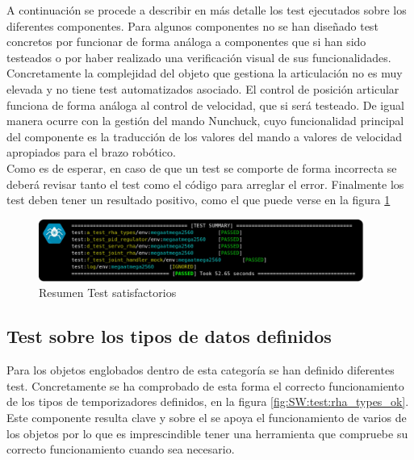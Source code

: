     A continuación se procede a describir en más detalle los test ejecutados sobre los diferentes componentes. Para algunos componentes no se han diseñado test concretos por funcionar de forma análoga a componentes que si han sido testeados o por haber realizado una verificación visual de sus funcionalidades.
    \\
    
    Concretamente la complejidad del objeto que gestiona la articulación no es muy elevada y no tiene test automatizados asociado. El control de posición articular funciona de forma análoga al control de velocidad, que si será testeado. De igual manera ocurre con la gestión del mando Nunchuck, cuyo funcionalidad principal del componente es la traducción de los valores del mando a valores de velocidad apropiados para el brazo robótico.
    \\
    
    Como es de esperar, en caso de que un test se comporte de forma incorrecta se deberá revisar tanto el test como el código para arreglar el error. Finalmente los test deben tener un resultado positivo, como el que puede verse en la figura \ref{fig:SW:test:sum_ok}

    \begin{figure}[H]
        \centering
        \includegraphics[width=0.95\textwidth]{figuras/Imagenes_SW/test/SWTest_8.jpg}
        \caption{Resumen Test satisfactorios}
        \label{fig:SW:test:sum_ok}
    \end{figure}

    \subsection{Test sobre los tipos de datos definidos}
        Para los objetos englobados dentro de esta categoría se han definido diferentes test. Concretamente se ha comprobado de esta forma el correcto funcionamiento de los tipos de temporizadores definidos, en la figura \ref{fig:SW:test:rha_types_ok}. Este componente resulta clave y sobre el se apoya el funcionamiento de varios de los objetos por lo que es imprescindible tener una herramienta que compruebe su correcto funcionamiento cuando sea necesario.
        \\
        
